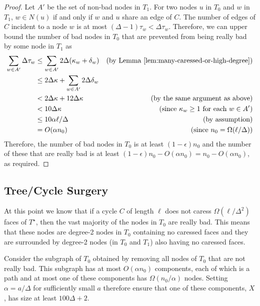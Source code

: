 \documentclass{patmorin}
\newcommand{\dual}[1]{{#1}^\star}
\begin{document}
\begin{proof}
  Let $A'$ be the set of non-bad nodes in $T_1$.  For two
  nodes $u$ in $T_0$ and $w$ in $T_1$,  $w\in N(u)$ if and only if $w$
  and $u$ share an edge of $C$.  The number of edges of $C$ incident to a node $w$ is at most $(\Delta-1)\tau_w < \Delta\tau_w$.  Therefore, we can upper bound the number of bad nodes in $T_0$ that are prevented from being really bad by some node in $T_1$ as
  \begin{align*}
   \sum_{w\in A'}\Delta \tau_w  
    & \le  \sum_{w\in A'}2\Delta(\kappa_w + \delta_w) & \text{(by \lemref{many-caressed-or-high-degree})} \\
    & \le  2\Delta\kappa + \sum_{w\in A'}2\Delta\delta_w \\
    & < 2\Delta\kappa + 12\Delta\kappa & \text{(by the same argument as above)}\\
    & < 10\Delta\kappa & \text{(since $\kappa_w\ge 1$ for each $w\in A'$)} \\
    & \le 10\alpha\ell/\Delta & \text{(by assumption)}\\
    & = O(\alpha n_0) & \text{(since $n_0=\Omega(\ell/\Delta)$)}
  \end{align*}
  Therefore, the number of bad nodes in $T_0$ is at least
  $(1-\epsilon)n_0$ and the number of these that are really bad is
  at least $(1-\epsilon)n_0 - O(\alpha n_0) = n_0-O(\alpha n_0)$,
  as required.
\end{proof}


\subsection{Tree/Cycle Surgery}

At this point we know that if a cycle $C$ of length $\ell$ does not caress $\Omega(\ell/\Delta^2)$ faces of $\dual{T}$, then the vast majority of the nodes in $T_0$ are really bad.  This means that these nodes are degree-2 nodes in $T_0$ containing no caressed faces and they are surrounded by degree-2 nodes (in $T_0$ and $T_1$) also having no caressed faces.


Consider the subgraph of $T_0$ obtained by removing all nodes of $T_0$
that are not really bad.  This subgraph has at most $O(\alpha n_0)$
components, each of which is a path and at most one of these components
has $\Omega(n_0/\alpha)$ nodes.  Setting $\alpha = a/\Delta$ for
sufficiently small $a$ therefore ensure that one of these components, $X$, has size at least $100\Delta+2$.
\end{document}
